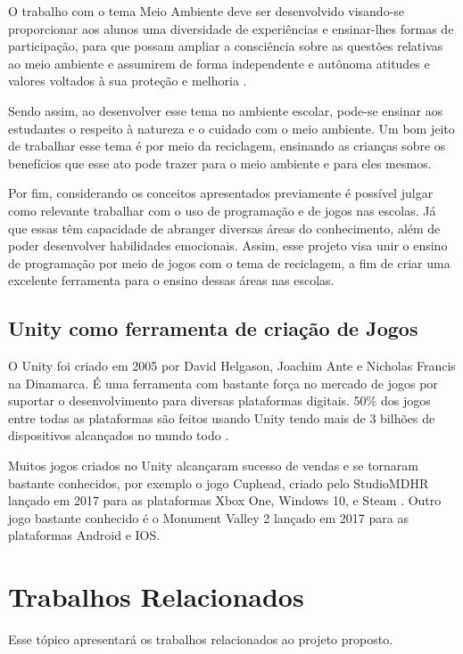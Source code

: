 \begin{citacao}

O trabalho com o tema Meio Ambiente deve ser desenvolvido visando-se proporcionar aos alunos uma diversidade de experiências e ensinar-lhes formas de participação, para que possam ampliar a consciência sobre as questões relativas ao meio ambiente e assumirem de forma independente e autônoma atitudes e valores voltados à sua proteção e melhoria \cite[p. 46]{pcns_2001}.

\end{citacao}

Sendo assim, ao desenvolver esse tema no ambiente escolar, pode-se ensinar aos estudantes o respeito à natureza e o cuidado com o meio ambiente. Um bom jeito de trabalhar esse tema é por meio da reciclagem, ensinando as crianças sobre os benefícios que esse ato pode trazer para o meio ambiente e para eles mesmos.

Por fim, considerando os conceitos apresentados previamente é possível julgar como relevante trabalhar com o uso de programação e de jogos nas escolas. Já que essas têm capacidade de abranger diversas áreas do conhecimento, além de poder desenvolver habilidades emocionais. Assim, esse projeto visa unir o ensino de programação por meio de jogos com o tema de reciclagem, a fim de criar uma excelente ferramenta para o ensino dessas áreas nas escolas.

\subsection{Unity como ferramenta de criação de Jogos}

O Unity foi criado em 2005 por David Helgason, Joachim Ante e Nicholas
Francis na Dinamarca. É uma ferramenta com bastante força no mercado de jogos por suportar o desenvolvimento para diversas plataformas digitais. 50\% dos jogos entre todas as plataformas são feitos usando Unity tendo mais de 3 bilhões de dispositivos alcançados no mundo todo \cite{dados_unity}.

Muitos jogos criados no Unity alcançaram sucesso de vendas e se tornaram bastante conhecidos, por exemplo o jogo Cuphead, criado pelo StudioMDHR lançado em 2017 para as plataformas Xbox One, Windows 10, e Steam \cite{cuphead}. Outro jogo bastante conhecido é o Monument Valley 2 lançado em 2017 para as plataformas Android e IOS\cite{monument_valley_2}.


\section{Trabalhos Relacionados}
Esse tópico apresentará os trabalhos relacionados ao projeto proposto.

